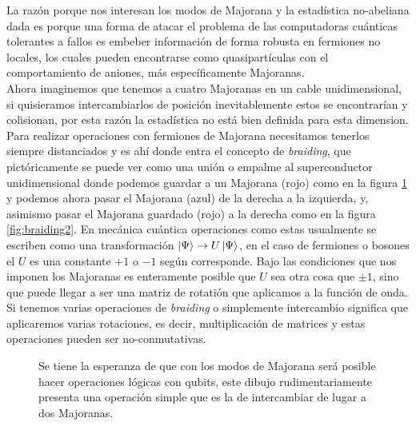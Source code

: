 La raz\'{o}n porque nos interesan los modos de Majorana y la estad\'{i}stica no-abeliana dada es porque una forma de atacar el problema de las computadoras cu\'{a}nticas tolerantes a fallos \cite{KITAEV20032}\cite{Bravyi2000FermionicQC} es embeber informaci\'{o}n de forma robusta en fermiones no locales, los cuales pueden encontrarse como quasipart\'{i}culas con el comportamiento de aniones, m\'{a}s espec\'{i}ficamente Majoranas.\\
Ahora imaginemos que tenemos a cuatro Majoranas en un cable unidimensional, si quisieramos intercambiarlos de posici\'{o}n inevitablemente estos se encontrar\'{i}an y colisionan, por esta raz\'{o}n la estad\'{i}stica no est\'{a} bien definida para esta dimension. Para realizar operaciones con fermiones de Majorana necesitamos tenerlos siempre distanciados y es ah\'{i} donde entra el concepto de \emph{braiding}, que pict\'{o}ricamente se puede ver como una uni\'{o}n o empalme al superconductor unidimensional donde podemos guardar a un Majorana (rojo) como en la figura \ref{fig:braiding1} y podemos ahora pasar el Majorana (azul) de la derecha a la izquierda, y, asimismo pasar el Majorana guardado (rojo) a la derecha como en la figura \ref{fig:braiding2}. En mec\'{a}nica cu\'{a}ntica operaciones como estas usualmente se escriben como una transformaci\'{o}n $\ket\Psi\rightarrow U\ket\Psi$, en el caso de fermiones o bosones el $U$ es una constante $+1$ o $-1$ seg\'{u}n corresponde. Bajo las condiciones que nos imponen los Majoranas es enteramente posible que $U$ sea otra cosa que $\pm 1$, sino que puede llegar a ser una matriz de rotati\'{o}n que aplicamos a la funci\'{o}n de onda. Si tenemos varias operaciones de \emph{braiding} o simplemente intercambio significa que aplicaremos varias rotaciones, es decir, multiplicaci\'{o}n de matrices y estas operaciones pueden ser no-conmutativas.
\begin{figure}[ht]
\centering
{}
\caption{Se tiene la esperanza de que con los modos de Majorana ser\'{a} posible hacer operaciones l\'{o}gicas con qubits, este dibujo rudimentariamente presenta una operaci\'{o}n simple que es la de intercambiar de lugar a dos Majoranas.}
\label{fig:braiding1}
\end{figure}

